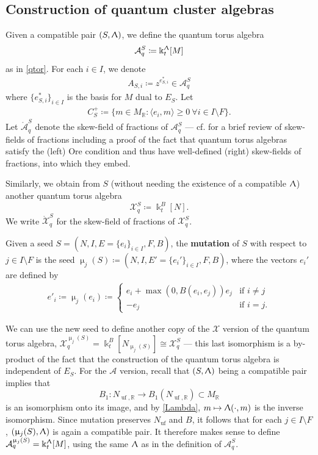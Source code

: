 \documentclass{amsart}
\DeclareMathOperator{\uf}{uf}
\let\bb=\mathbb
\let\rar=\rightarrow
\let\s=\mathcal
\let\mr=\mathring
\newcommand {\kk} {\Bbbk}
\renewcommand{\Lambda}{\Uplambda}
\renewcommand{\mu}{\upmu}
\theoremstyle{plain}%
\theoremstyle{definition}
\theoremstyle{remark}
\begin{document}
\subsection{Construction of quantum cluster algebras}\label{qclusterdefs}
Given a compatible pair $(S,\Lambda)$, we define the quantum torus algebra $$\s{A}_q^S\coloneqq \kk^{\Lambda}_t[M]$$ as in \eqref{qtor}.  For each $i\in I$, we denote
\begin{align*}
A_{S,i}\coloneqq z^{e_{S,i}^*}\in \s{A}_q^S  
\end{align*}
where $\{e_{S,i}^*\}_{i\in I}$ is the basis for $M$ dual to $E_S$.   
Let 
\begin{align}\label{CS+}
    C_S^+\coloneqq \{m\in M_{\bb{R}}\colon \langle e_i,m\rangle \geq 0 ~ \forall  i\in I\setminus F\}.
\end{align}   Let $\mr{\s{A}}_q^S$ denote the skew-field of fractions of $\s{A}_q^S$ --- cf. \cite[\S 11]{BZ} for a brief review of skew-fields of fractions including a proof of the fact that quantum torus algebras satisfy the (left) Ore condition and thus have well-defined (right) skew-fields of fractions, into which they embed.

Similarly, we obtain from $S$ (without needing the existence of a compatible $\Lambda$) another quantum torus algebra $$\s{X}_q^S\coloneqq \kk^{B}_t[N].$$  
We write $\mr{\s{X}}_q^S$ for the skew-field of fractions of $\s{X}_q^S$. 


Given a seed $S=(N,I,E=\{e_i\}_{i\in I},F,B)$, the {\bf mutation} of $S$ with respect to $j\in I\setminus F$ is the seed $\mu_j(S)\coloneqq (N,I,E'=\{e_i'\}_{i\in I},F,B)$, where the vectors $e_i'$ are defined by
\begin{align}\label{eprime}
    e'_{i} \coloneqq  \mu_{j}(e_{i})\coloneqq \left\{ \begin{array}{lr}
  e_{i}+\max(0,B(e_i,e_j))e_{j} &\mbox{if $i\neq j$~} \\
    -e_{j} &\mbox{if $i=j$.} 
	\end{array} \right.
\end{align}


We can use the new seed to define another copy of the $\s{X}$ version of the quantum torus algebra, $\s{X}_q^{\mu_j(S)}=\kk_t^B[N_{\mu_j(S)}]\cong\s{X}_q^S$ --- this last isomorphism is a by-product of the fact that the construction of the quantum torus algebra is independent of $E_S$. For the $\s{A}$ version, recall that $(S,\Lambda)$ being a compatible pair implies that 
\[
B_1\colon N_{\uf,\bb{R}}\rar B_1(N_{\uf,\bb{R}})\subset M_{\bb{R}}
\]
is an isomorphism onto its image, and by \eqref{Lambda}, $m\mapsto \Lambda(\cdot,m)$ is the inverse isomorphism.  Since mutation preserves $N_{\uf}$ and $B$, it follows that for each $j\in I\setminus F$, $(\mu_j(S),\Lambda)$ is again a compatible pair.   It therefore makes sense to define $\s{A}_q^{\mu_j(S)}=\kk_t^{\Lambda}[M]$, using the same $\Lambda$ as in the definition of $\s{A}_q^S$.
\end{document}
